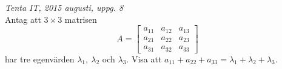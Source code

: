 {\it Tenta IT, 2015 augusti, uppg. 8}\\
Antag att $3\times 3$ matrisen
$$A=\begin{bmatrix}a_{11}&a_{12}&a_{13}\\a_{21}&a_{22}&a_{23}\\a_{31}&a_{32}&a_{33}\end{bmatrix}$$
har tre egenvärden $\lambda_1,\ \lambda_2$ och $\lambda_3$. Visa att $a_{11}+a_{22}+a_{33}=\lambda_1+\lambda_2+\lambda_3$.
